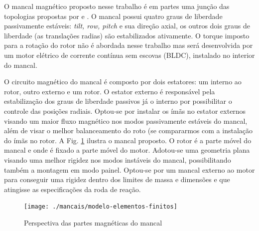 
O mancal magnético proposto nesse trabalho é em partes uma junção das topologias propostas por \citet{Bernus1998} e \citet{Scharfe2001}. O mancal possui quatro graus de liberdade passivamente estáveis: \textit{tilt, row, pitch} e sua direção axial, os outros dois graus de liberdade (as translações radias) são estabilizados ativamente. O torque imposto para a rotação do rotor não é abordada nesse trabalho mas será desenvolvida por um motor elétrico de corrente contínua sem escovas (BLDC), instalado no interior do mancal.

O circuito magnético do mancal é composto por dois estatores: um interno ao rotor, outro externo e um rotor. O estator externo é responsável pela estabilização dos graus de liberdade passivos já o interno por possibilitar o controle das posições radiais. Optou-se por instalar os ímãs no estator externos visando um maior fluxo magnético nos modos passivamente estáveis do mancal, além de visar o melhor balanceamento do roto (se compararmos com a instalação do ímãs no rotor. A Fig. \ref{fig:mancal:topo} ilustra o mancal proposto. O rotor é a parte móvel do mancal e onde é fixado a parte móvel do motor. Adotou-se uma geometria plana visando uma melhor rigidez nos modos instáveis do mancal, possibilitando também a montagem em modo painel. Optou-se por um mancal externo ao motor  para conseguir uma rigidez dentro dos limites de massa e dimensões e que atingisse as especificações  da roda de reação. 

\begin{figure}[ht!]
\centering
\texttt{[image: ./mancais/modelo-elementos-finitos]}
\caption[Corte ilustrativo do mancal magnético]{Perspectiva das partes magnéticas do mancal}
\label{fig:mancal:topo}
\end{figure}


